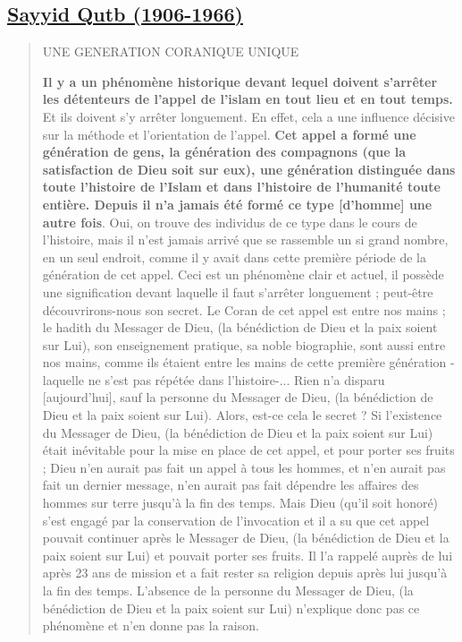 \hypertarget{sayyid-qutb-1906-1966}{%
\subsection{\texorpdfstring{\underline{Sayyid Qutb
(1906-1966)}}{Sayyid Qutb (1906-1966)}}\label{sayyid-qutb-1906-1966}}

\begin{quote}
UNE GENERATION CORANIQUE UNIQUE

\textbf{Il y a un phénomène historique devant lequel doivent s'arrêter
les détenteurs de l'appel de l'islam en tout lieu et en tout temps.} Et
ils doivent s'y arrêter longuement. En effet, cela a une influence
décisive sur la méthode et l'orientation de l'appel. \textbf{Cet appel a
formé une génération de gens, la génération des compagnons (que la
satisfaction de Dieu soit sur eux), une génération distinguée dans toute
l'histoire de l'Islam et dans l'histoire de l'humanité toute entière.
Depuis il n'a jamais été formé ce type {[}d'homme{]} une autre fois}.
Oui, on trouve des individus de ce type dans le cours de l'histoire,
mais il n'est jamais arrivé que se rassemble un si grand nombre, en un
seul endroit, comme il y avait dans cette première période de la
génération de cet appel. Ceci est un phénomène clair et actuel, il
possède une signification devant laquelle il faut s'arrêter longuement ;
peut-être découvrirons-nous son secret. Le Coran de cet appel est entre
nos mains ; le hadith du Messager de Dieu, (la bénédiction de Dieu et la
paix soient sur Lui), son enseignement pratique, sa noble biographie,
sont aussi entre nos mains, comme ils étaient entre les mains de cette
première génération - laquelle ne s'est pas répétée dans l'histoire-...
Rien n'a disparu {[}aujourd'hui{]}, sauf la personne du Messager de
Dieu, (la bénédiction de Dieu et la paix soient sur Lui). Alors, est-ce
cela le secret ? Si l'existence du Messager de Dieu, (la bénédiction de
Dieu et la paix soient sur Lui) était inévitable pour la mise en place
de cet appel, et pour porter ses fruits ; Dieu n'en aurait pas fait un
appel à tous les hommes, et n'en aurait pas fait un dernier message,
n'en aurait pas fait dépendre les affaires des hommes sur terre jusqu'à
la fin des temps. Mais Dieu (qu'il soit honoré) s'est engagé par la
conservation de l'invocation et il a su que cet appel pouvait continuer
après le Messager de Dieu, (la bénédiction de Dieu et la paix soient sur
Lui) et pouvait porter ses fruits. Il l'a rappelé auprès de lui après 23
ans de mission et a fait rester sa religion depuis après lui jusqu'à la
fin des temps. L'absence de la personne du Messager de Dieu, (la
bénédiction de Dieu et la paix soient sur Lui) n'explique donc pas ce
phénomène et n'en donne pas la raison.


\end{quote}
